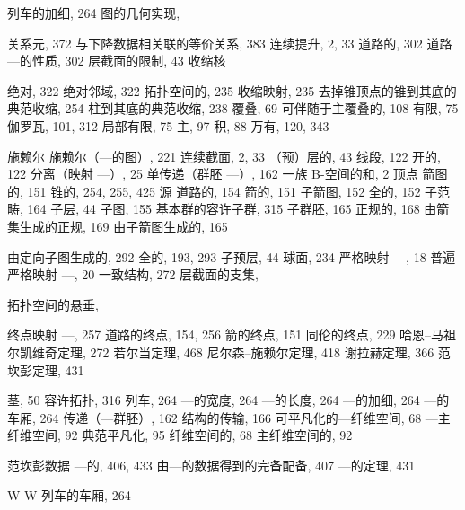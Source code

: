 
列车的加细, 264 图的几何实现,

关系元, 372 与下降数据相关联的等价关系, 383 连续提升, 2, 33 道路的, 302 道路---的性质, 302 层截面的限制, 43 收缩核

绝对, 322 绝对邻域, 322 拓扑空间的, 235 收缩映射, 235 去掉锥顶点的锥到其底的典范收缩, 254 柱到其底的典范收缩, 238 覆叠, 69 可伴随于主覆叠的, 108 有限, 75 伽罗瓦, 101, 312 局部有限, 75 主, 97 积, 88 万有, 120, 343


施赖尔 施赖尔（---的图）, 221 连续截面, 2, 33 （预）层的, 43 线段, 122 开的, 122 分离（映射 ---）, 25 单传递（群胚 ---）, 162 一族 B-空间的和, 2 顶点 箭图的, 151 锥的, 254, 255, 425 源 道路的, 154 箭的, 151 子箭图, 152 全的, 152 子范畴, 164 子层, 44 子图, 155 基本群的容许子群, 315 子群胚, 165 正规的, 168 由箭集生成的正规, 169 由子箭图生成的, 165

由定向子图生成的, 292 全的, 193, 293 子预层, 44 球面, 234 严格映射 ---, 18 普遍严格映射 ---, 20 一致结构, 272 层截面的支集,

拓扑空间的悬垂,


终点映射 ---, 257 道路的终点, 154, 256 箭的终点, 151 同伦的终点, 229 哈恩–马祖尔凯维奇定理, 272 若尔当定理, 468 尼尔森–施赖尔定理, 418 谢拉赫定理, 366 范坎彭定理, 431

茎, 50 容许拓扑, 316 列车, 264 ---的宽度, 264 ---的长度, 264 ---的加细, 264 ---的车厢, 264 传递（---群胚）, 162 结构的传输, 166 可平凡化的---纤维空间, 68 ---主纤维空间, 92 典范平凡化, 95 纤维空间的, 68 主纤维空间的, 92


范坎彭数据 ---的, 406, 433 由---的数据得到的完备配备, 407 ---的定理, 431

W W 列车的车厢, 264
